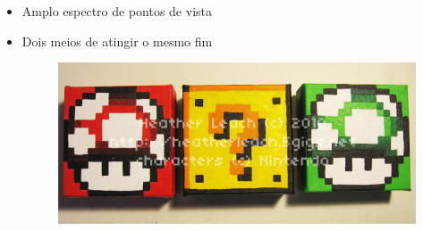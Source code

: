 \documentclass[xcolor=dvipsnames]{beamer}
\newcommand{\byellow}[1]{\colorbox{yellow}{#1}}
\newcommand{\bgreen}[1]{\colorbox{green}{#1}}
\begin{document}
\begin{frame}
\begin{center}
\begin{itemize}
\begin{itemize}
\end{itemize}
\item Amplo espectro de pontos de vista\vspace{0.1cm}
\item Dois meios de atingir o mesmo fim \pause
	\begin{figure}
	\includegraphics[scale=0.9]{mushrooms.jpg}\\
	\end{figure}
\
\end{itemize}
\end{center}
\end{frame}
\end{document}

